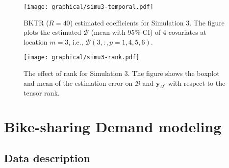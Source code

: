 \documentclass[12pt]{article}
\begin{document}
\begin{figure}[!t]
\centering
{
\texttt{[image: graphical/simu3-temporal.pdf]}
}
\caption{BKTR ($R=40$) estimated coefficients for Simulation 3. The figure plots the estimated $\boldsymbol{\mathcal{B}}$ (mean with 95\% CI) of 4 covariates at location $m=3$, i.e., $\boldsymbol{\mathcal{B}}(3,:,p=1,4,5,6)$.}
\label{fig:simu3_new}
\end{figure}


\begin{figure}[!t]
\centering
\texttt{[image: graphical/simu3-rank.pdf]}
\caption{The effect of rank for Simulation 3. The figure shows the boxplot and mean of the estimation error on $\boldsymbol{\mathcal{B}}$ and $\boldsymbol{y}_{\Omega^c}$ with respect to the tensor rank.}
\label{fig:simu3_rank}
\end{figure}



\section{Bike-sharing Demand modeling}
\label{sec:application}

\subsection{Data description}
\end{document}

